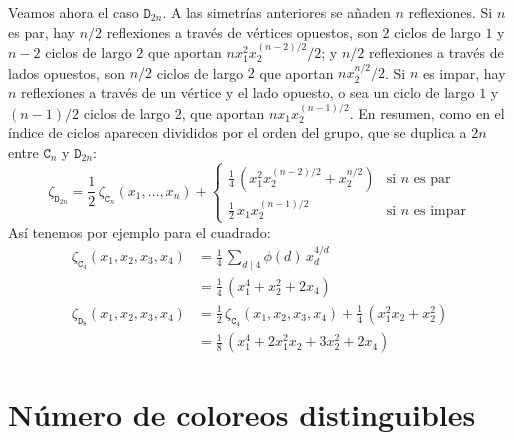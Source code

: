   Veamos ahora el caso \(\mathtt{D}_{2 n}\).%
  A las simetrías anteriores se añaden \(n\) reflexiones.
  Si \(n\) es par,
  hay \(n / 2\) reflexiones a través de vértices opuestos,
  son \(2\) ciclos de largo \(1\) y \(n - 2\) ciclos de largo \(2\)
  que aportan \(n x_1^2 x_2^{(n - 2) / 2} / 2\);
  y \(n / 2\) reflexiones a través de lados opuestos,
  son \(n / 2\) ciclos de largo \(2\)
  que aportan \(n x_2^{n / 2} / 2\).
  Si \(n\) es impar,
  hay \(n\) reflexiones a través de un vértice y el lado opuesto,
  o sea un ciclo de largo \(1\)
  y \((n - 1) / 2\) ciclos de largo \(2\),
  que aportan \(n x_1 x_2^{(n - 1) / 2}\).
  En resumen,
  como en el índice de ciclos
  aparecen divididos por el orden del grupo,
  que se duplica a \(2 n\)
  entre \(\mathtt{C}_n\) y \(\mathtt{D}_{2 n}\):
  \begin{equation*}
    \zeta_{\mathtt{D}_{2 n}}
      = \frac{1}{2} \, \zeta_{\mathtt{C}_n}(x_1, \dotsc, x_n) +
	   \begin{cases}
	     \frac{1}{4} \, (x_1^2 x_2^{(n - 2) / 2} + x_2^{n / 2})
		 & \text{si \(n\) es par} \\[1ex]
	     \frac{1}{2} \, x_1 x_2^{(n - 1) / 2}
		 & \text{si \(n\) es impar}
	   \end{cases}
  \end{equation*}
  Así tenemos por ejemplo para el cuadrado:
  \begin{align*}
    \zeta_{\mathtt{C}_4} (x_1, x_2, x_3, x_4)
      &= \frac{1}{4} \, \sum_{d \mid 4} \phi(d) \, x_d^{4 / d} \\
      &= \frac{1}{4} \, \left(
			  x_1^4 + x_2^2 + 2 x_4
			\right) \\
    \zeta_{\mathtt{D}_8} (x_1, x_2, x_3, x_4)
      &= \frac{1}{2} \, \zeta_{\mathtt{C}_4} (x_1, x_2, x_3, x_4)
	   + \frac{1}{4} \, \left(
			       x_1^2 x_2 + x_2^2
			    \right) \\
      &= \frac{1}{8} \, \left(
			   x_1^4 + 2 x_1^2 x_2 + 3 x_2^2 + 2 x_4
			\right)
  \end{align*}

\section{Número de coloreos distinguibles}
\label{sec:coloreos-distinguibles}




